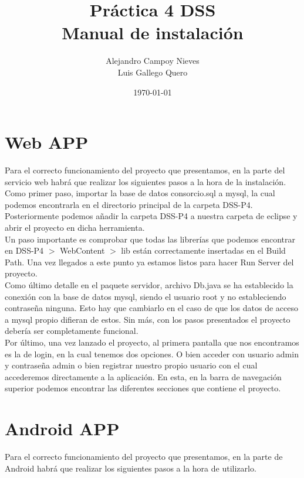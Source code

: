 \documentclass[a4paper,12pt,oneside]{article}
\title{Práctica 4 DSS \\ Manual de instalación}
\author{Alejandro Campoy Nieves \\ Luis Gallego Quero}
\date{\today}
\begin{document}
\maketitle			
 
\section{Web APP}

Para el correcto funcionamiento del proyecto que presentamos, en la parte del servicio web habrá que realizar los siguientes pasos a la hora de la instalación. \\

Como primer paso, importar la base de datos consorcio.sql a mysql, la cual podemos encontrarla en el directorio principal de la carpeta DSS-P4. Posteriormente podemos añadir la carpeta DSS-P4 a nuestra carpeta de eclipse y abrir el proyecto en dicha herramienta. \\

Un paso importante es comprobar que todas las librerías que podemos encontrar en DSS-P4 $>$ WebContent $>$ lib están correctamente insertadas en el Build Path. Una vez llegados a este punto ya estamos listos para hacer Run Server del proyecto. \\

Como último detalle en el paquete servidor, archivo Db.java se ha establecido la conexión con la base de datos mysql, siendo el usuario root y no estableciendo contraseña ninguna. Esto hay que cambiarlo en el caso de que los datos de acceso a mysql propio difieran de estos. Sin más, con los pasos presentados el proyecto debería ser completamente funcional. \\

Por último, una vez lanzado el proyecto, al primera pantalla que nos encontramos es la de login, en la cual tenemos dos opciones. O bien acceder con usuario admin y contraseña admin o bien registrar nuestro propio usuario con el cual accederemos directamente a la aplicación. En esta, en la barra de navegación superior podemos encontrar las diferentes secciones que contiene el proyecto.

\section{Android APP}

Para el correcto funcionamiento del proyecto que presentamos, en la parte de Android habrá que realizar los siguientes pasos a la hora de utilizarlo.\\
\end{document}
